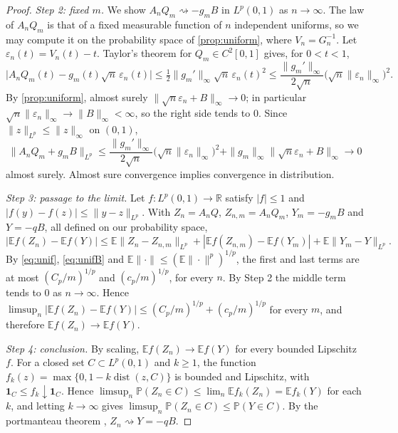 \documentclass[11pt]{amsart}
\theoremstyle{remark}
\newtheorem{remark}[theorem]{Remark}
\newcommand{\R}{\mathbb{R}}
\newcommand{\E}{\mathbb{E}}
\newcommand{\Prob}{\mathbb{P}}
\newcommand{\ind}{\mathbf{1}}
\newcommand{\Lp}{L^p(0,1)}
\newcommand{\weak}{\rightsquigarrow}
\begin{document}
\begin{proof}
\emph{Step 2: fixed $m$.} We show $A_nQ_m\weak-g_mB$ in $\Lp$ as $n\to\infty$. The law of $A_nQ_m$ is that of a fixed measurable function of $n$ independent uniforms, so we may compute it on the probability space of \cref{prop:uniform}, where $V_n=G_n^{-1}$. Let $\varepsilon_n(t)=V_n(t)-t$. Taylor's theorem for $Q_m\in C^2[0,1]$ gives, for $0<t<1$,
\[
\big|A_nQ_m(t)-g_m(t)\sqrt n\,\varepsilon_n(t)\big|\le\tfrac12\|g_m'\|_\infty\sqrt n\,\varepsilon_n(t)^2\le\frac{\|g_m'\|_\infty}{2\sqrt n}\big(\sqrt n\|\varepsilon_n\|_\infty\big)^2 .
\]
By \cref{prop:uniform}, almost surely $\|\sqrt n\varepsilon_n+B\|_\infty\to0$; in particular $\sqrt n\|\varepsilon_n\|_\infty\to\|B\|_\infty<\infty$, so the right side tends to $0$. Since $\|z\|_{L^p}\le\|z\|_\infty$ on $(0,1)$,
\[
\|A_nQ_m+g_mB\|_{L^p}\le\frac{\|g_m'\|_\infty}{2\sqrt n}\big(\sqrt n\|\varepsilon_n\|_\infty\big)^2+\|g_m\|_\infty\|\sqrt n\varepsilon_n+B\|_\infty\to0
\]
almost surely. Almost sure convergence implies convergence in distribution.

\emph{Step 3: passage to the limit.} Let $f:\Lp\to\R$ satisfy $|f|\le1$ and $|f(y)-f(z)|\le\|y-z\|_{L^p}$. With $Z_n=A_nQ$, $Z_{n,m}=A_nQ_m$, $Y_m=-g_mB$ and $Y=-qB$, all defined on our probability space,
\[
|\E f(Z_n)-\E f(Y)|\le\E\|Z_n-Z_{n,m}\|_{L^p}+|\E f(Z_{n,m})-\E f(Y_m)|+\E\|Y_m-Y\|_{L^p}.
\]
By \eqref{eq:unif}, \eqref{eq:unifB} and $\E\|\cdot\|\le(\E\|\cdot\|^p)^{1/p}$, the first and last terms are at most $(C_p/m)^{1/p}$ and $(c_p/m)^{1/p}$, for every $n$. By Step 2 the middle term tends to $0$ as $n\to\infty$. Hence $\limsup_n|\E f(Z_n)-\E f(Y)|\le(C_p/m)^{1/p}+(c_p/m)^{1/p}$ for every $m$, and therefore $\E f(Z_n)\to\E f(Y)$.

\emph{Step 4: conclusion.} By scaling, $\E f(Z_n)\to\E f(Y)$ for every bounded Lipschitz $f$. For a closed set $C\subset\Lp$ and $k\ge1$, the function $f_k(z)=\max\{0,1-k\operatorname{dist}(z,C)\}$ is bounded and Lipschitz, with $\ind_C\le f_k\downarrow\ind_C$. Hence $\limsup_n\Prob(Z_n\in C)\le\lim_n\E f_k(Z_n)=\E f_k(Y)$ for each $k$, and letting $k\to\infty$ gives $\limsup_n\Prob(Z_n\in C)\le\Prob(Y\in C)$. By the portmanteau theorem \cite[Section~2]{Billingsley1999}, $Z_n\weak Y=-qB$.
\end{proof}

\end{document}
